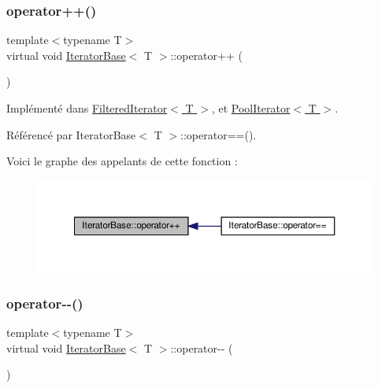 \subsubsection{\texorpdfstring{operator++()}{operator++()}}
{\footnotesize\ttfamily template$<$typename T$>$ \\
virtual void \hyperlink{class_iterator_base}{Iterator\+Base}$<$ T $>$\+::operator++ (\begin{DoxyParamCaption}{ }\end{DoxyParamCaption})\hspace{0.3cm}{\ttfamily [pure virtual]}}



Implémenté dans \hyperlink{class_filtered_iterator_ae31347c47637172be3d19dc3be30f5cc}{Filtered\+Iterator$<$ T $>$}, et \hyperlink{class_pool_iterator_a0da86ab88d60973aee45e6a51a929138}{Pool\+Iterator$<$ T $>$}.



Référencé par Iterator\+Base$<$ T $>$\+::operator==().

Voici le graphe des appelants de cette fonction \+:\nopagebreak
\begin{figure}[H]
\begin{center}
\leavevmode
\includegraphics[width=350pt]{class_iterator_base_a816f35e9020716d212124a34f1c033fb_icgraph}
\end{center}
\end{figure}
\mbox{\label{class_iterator_base_aa9bf0f75a8bb7e4d416a9b88ccacd9c7}} 
\subsubsection{\texorpdfstring{operator-\/-\/()}{operator--()}}
{\footnotesize\ttfamily template$<$typename T$>$ \\
virtual void \hyperlink{class_iterator_base}{Iterator\+Base}$<$ T $>$\+::operator-\/-\/ (\begin{DoxyParamCaption}{ }\end{DoxyParamCaption})\hspace{0.3cm}{\ttfamily [pure virtual]}}



